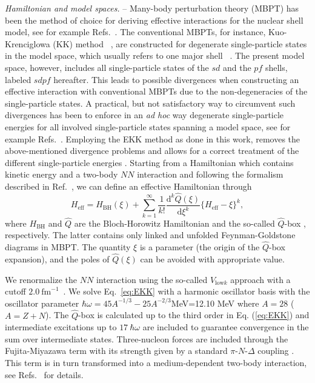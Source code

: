 \documentclass[aps,prl,twocolumn,groupedaddress,showkeys,showpacs,floatfix,superscriptaddress]{revtex4-1}
\newcommand\Heff{H_{\mathrm{eff}}}
\newcommand\HBH{H_{\mathrm{BH}}}
\newcommand\Vlowk{V_{\mathrm{low}k}}
\newcommand\fmi{\mathrm{fm}^{-1}}
\newcommand\+{^\dagger}
\newcommand\diff{\mathrm{d}}
\newcommand\Qbox{$\hat{Q}$-box }
\newcommand\hw{\hbar\omega}
\begin{document}
{\it Hamiltonian and model spaces.} --
Many-body perturbation theory (MBPT) has been the
method of choice for deriving effective interactions for the nuclear shell model, see for example
Refs.~\cite{Kuo:1971em,Krenciglowa1974171, Krenciglowa1977381,Kuo_springer,HjorthJensen1995125}.  
The conventional MBPTs, for instance, Kuo-Krenciglowa (KK) method 
~\cite{Kuo:1971em,Krenciglowa1974171, Krenciglowa1977381}, are constructed 
for degenerate single-particle states in the model space, which usually refers to one major shell
~\cite{Kuo:1971em,Krenciglowa1974171, Krenciglowa1977381,Kuo_springer,HjorthJensen1995125}.   
The present model space, however, includes all single-particle states of the
$sd$ and the $pf$ shells, labeled $sdpf$ hereafter.  
This leads to possible divergences when
constructing an effective interaction with conventional MBPTs due to the
non-degeneracies of the 
single-particle states.
A practical, but not satisfactory way to
circumvent such divergences has been to enforce in an {\em ad hoc} way degenerate
single-particle energies for all involved single-particle
states spanning a model space, see for example
Refs.~\cite{Holt:2012gc,Holt:2013en,Holt:2014uc}.  
Employing the EKK method as done in this work, removes the
above-mentioned divergence problems and allows for a correct treatment of
the different single-particle energies \cite{Tsunoda:2014hj}.
Starting from a Hamiltonian which contains kinetic energy and a two-body $NN$ interaction and
following the formalism described in Ref.~\cite{Tsunoda:2014hj}, we can define  an effective Hamiltonian through
\begin{equation}\label{eq:EKK}
\Heff=\HBH(\xi)+
 \sum_{k=1}^{\infty}\frac{1}{k!}\frac{\diff^k \hat{Q}(\xi)}{\diff \xi^k}\{\Heff -\xi\}^k, 
\end{equation}
where $\HBH$ and $\hat{Q}$ are the Bloch-Horowitz Hamiltonian and the so-called \Qbox \cite{Kuo_springer,HjorthJensen1995125}, respectively. 
The latter contains only linked and unfolded  
Feynman-Goldstone diagrams in MBPT.
The quantity $\xi$ is a parameter (the origin of the \Qbox expansion), and the poles of $\hat{Q}(\xi)$ can be
avoided with appropriate value. 

We renormalize the $NN$ interaction using the so-called $\Vlowk$ approach with a cutoff
$2.0~\fmi$~\cite{Entem:2003hx,PhysRevC.65.051301,PhysRevC.70.061002}.
We solve Eq.~\eqref{eq:EKK} with a  harmonic oscillator basis with the oscillator parameter 
$\hw=45 A^{-1/3} - 25 A^{-2/3}$MeV=12.10 MeV where $A=28$ ($A=Z+N$).  
The \Qbox is calculated up to the third order in Eq. (\ref{eq:EKK}) 
and intermediate excitations up to $17~\hw$
are included to guarantee convergence in the sum over intermediate
states.  Three-nucleon forces are included through the Fujita-Miyazawa
term with its strength given by a standard $\pi$-$N$-$\Delta$ coupling  
\cite{greenRepProgPhys}. 
This term is in turn  transformed into a medium-dependent two-body
interaction, see  
Refs.~\cite{PhysRevLett.105.032501,Holt:2013jk,Holt:2014uc} for details. 
 
\end{document}
